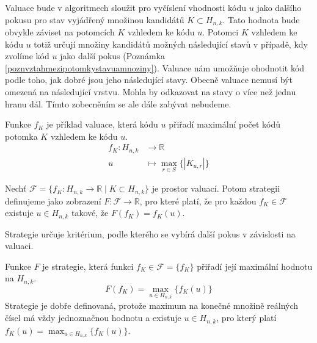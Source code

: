 Valuace bude v algoritmech sloužit pro vyčíslení vhodnosti kódu $u$ jako dalšího pokusu pro stav vyjádřený množinou kandidátů $K\subset H_{n,k}$. Tato hodnota bude obvykle záviset na potomcích $K$ vzhledem ke kódu $u$. Potomci $K$ vzhledem ke kódu $u$ totiž určují množiny kandidátů možných následující stavů v případě, kdy zvolíme kód $u$ jako další pokus (Poznámka \ref{poznvztahmezipotomkystavuamnoziny}). Valuace nám umožňuje ohodnotit kód podle toho, jak dobré jsou jeho následující stavy. Obecně valuace nemusí být omezená na následující vrstvu. Mohla by odkazovat na stavy o více než jednu hranu dál. Tímto zobecněním se ale dále zabývat nebudeme.

\begin{prikl}\label{prjednokrokfce}
    Funkce $f_K$ je příklad valuace, která kódu $u$ přiřadí maximální počet kódů potomka $K$ vzhledem ke kódu $u$.
    \begin{align*}
        f_K \colon H_{n,k} &\to \mathbb{R} \\
        u &\mapsto \max_{r\in S}\{|K_{u,r}|\} 
    \end{align*}
\end{prikl}


\begin{definice}[Strategie]
    Nechť $\mathcal{F} = \{f_K\colon H_{n,k} \to \mathbb{R} \mid K \subset H_{n,k}\}$ je prostor valuací. Potom strategii definujeme jako zobrazení $F \colon \mathcal{F} \to \mathbb{R}$, pro které platí, že pro každou $f_K \in \mathcal{F}$ existuje $u\in H_{n,k}$ takové, že $F(f_K) = f_K(u)$.
\end{definice}
Strategie určuje kritérium, podle kterého se vybírá další pokus v závislosti na valuaci. 


\begin{prikl}\label{prstrategie}
    Funkce $F$ je strategie, která funkci $f_K \in \mathcal{F} = \{f_K\}$ přiřadí její maximální hodnotu na $H_{n,k}$.
    \[F(f_K) =  \max_{u\in H_{n,k}}\{f_K(u)\}\]
    Strategie je dobře definovaná, protože maximum na konečné množině reálných čísel má vždy jednoznačnou hodnotu a existuje $u\in H_{n,k}$, pro který platí $f_K(u) = \max_{u\in H_{n,k}}\{f_K(u)\}$.
\end{prikl}

